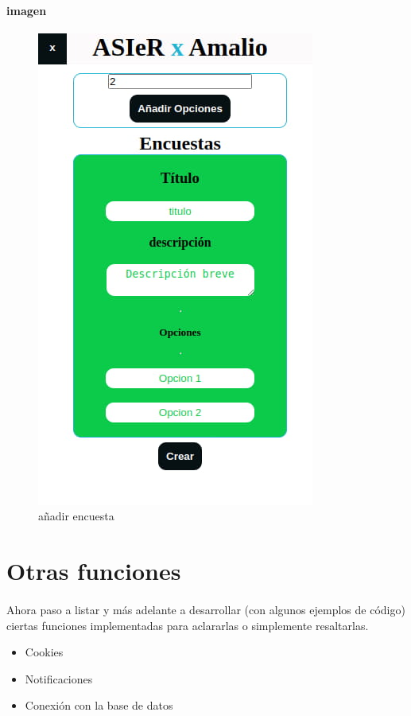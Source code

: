 \documentclass[a4paper]{article}
\begin{document}
 \paragraph{imagen}
 \begin{figure}[ht]
    \includegraphics[scale=0.5]{./assets/add-encuesta.jpg}
    \centering
    \caption{añadir encuesta}
    \label{fig:add-encuesta}
 \end{figure}
 \newpage
 \section[Otras funciones]{Otras funciones}
 \paragraph{}
 Ahora paso a listar y más adelante a desarrollar (con algunos ejemplos de código)
 ciertas funciones implementadas para aclararlas o simplemente resaltarlas.
 \begin{itemize}
   \item Cookies
   \item Notificaciones
   \item Conexión con la base de datos 
 \end{itemize}
\end{document}
